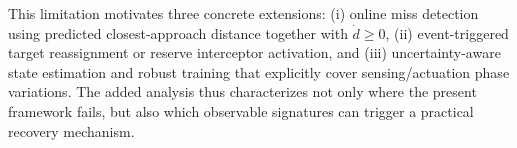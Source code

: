 \documentclass[10pt]{article}
\begin{document}
This limitation motivates three concrete extensions: (i) online miss
detection using predicted closest-approach distance together with
\(\dot d\geq 0\), (ii) event-triggered target reassignment or reserve
interceptor activation, and (iii) uncertainty-aware state estimation and
robust training that explicitly cover sensing/actuation phase variations.
The added analysis thus characterizes not only where the present framework
fails, but also which observable signatures can trigger a practical recovery
mechanism.
\end{document}
